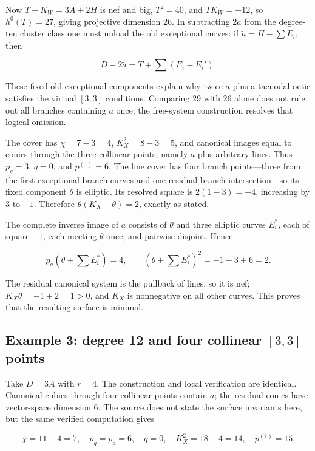 Now \(T-K_W=3 A+2 H\) is nef and big, \(T^2=40\), and \(TK_W=-12\), so \(h^0(T)=27\), giving projective dimension 26. In subtracting \(2a\) from the degree-ten cluster class one must unload the old exceptional curves: if \(\widetilde a=H-\sum E_i\), then

\[
D-2\widetilde a=T+\sum(E_i-E_i').
\]

These fixed old exceptional components explain why twice \(a\) plus a tacnodal octic satisfies the virtual \([3,3]\) conditions. Comparing 29 with 26 alone does not rule out all branches containing \(a\) once; the free-system construction resolves that logical omission.

The cover has \(\chi=7-3=4\), \(K_X^2=8-3=5\), and canonical images equal to conics through the three collinear points, namely \(a\) plus arbitrary lines. Thus \(p_g=3\), \(q=0\), and \(p^{(1)}=6\). The line cover has four branch points---three from the first exceptional branch curves and one residual branch intersection---so its fixed component \(\theta\) is elliptic. Its resolved square is \(2(1-3)=-4\), increasing by 3 to \(-1\). Therefore \(\theta(K_X-\theta)=2\), exactly as stated.

The complete inverse image of \(a\) consists of \(\theta\) and three elliptic curves \(E_i^*\), each of square \(-1\), each meeting \(\theta\) once, and pairwise disjoint. Hence

\[
p_a(\theta+\sum E_i^*)=4,\qquad
(\theta+\sum E_i^*)^2=-1-3+6=2.
\]

The residual canonical system is the pullback of lines, so it is nef; \(K_X\theta=-1+2=1>0\), and \(K_X\) is nonnegative on all other curves. This proves that the resulting surface is minimal.

\subsection{\texorpdfstring{Example 3: degree 12 and four collinear \([3,3]\) points}{Example 3: degree 12 and four collinear {[}3,3{]} points}}

Take \(D=3 A\) with \(r=4\). The construction and local verification are identical. Canonical cubics through four collinear points contain \(a\); the residual conics have vector-space dimension 6. The source does not state the surface invariants here, but the same verified computation gives

\[
\chi=11-4=7,\quad p_g=p_a=6,\quad q=0,\quad
K_X^2=18-4=14,\quad p^{(1)}=15.
\tag{IV.18.6}
\]

